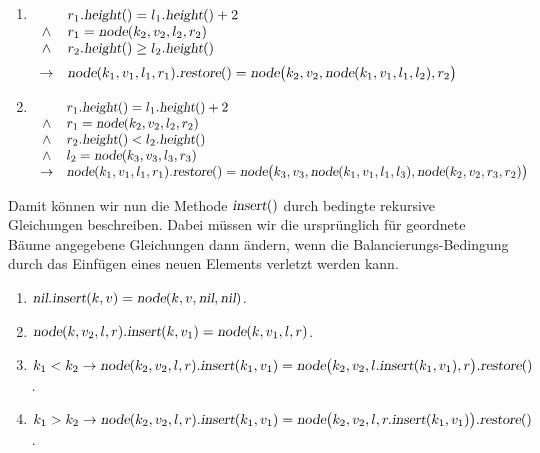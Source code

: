 \begin{enumerate}
      Es gibt noch zwei weitere F\"alle die auftreten, wenn der rechte Teilbaum um mehr als
      Eins gr\"o\3er ist als der linke Teilbaum.  Diese beiden F\"alle sind aber zu den beiden
      vorherigen F\"allen v\"ollig analog, so dass wir die Gleichungen hier ohne weitere
      Diskussion angeben.
\item $\begin{array}[t]{cl}
              & r_1.\textsl{height}() = l_1.\textsl{height}() + 2    \\ 
       \wedge & r_1 = \textsl{node}(k_2,v_2,l_2,r_2)               \\
       \wedge & r_2.\textsl{height}() \geq l_2.\textsl{height}()     \\[0.2cm]
       \rightarrow & \textsl{node}(k_1,v_1,l_1,r_1).\textsl{restore}() = 
                     \textsl{node}\bigl(k_2,v_2,\textsl{node}(k_1,v_1,l_1,l_2),r_2\bigr)
       \end{array}
      $
\item $\begin{array}[t]{cl}
               & r_1.\textsl{height}() = l_1.\textsl{height}() + 2    \\ 
        \wedge & r_1 = \textsl{node}(k_2,v_2,l_2,r_2)               \\
        \wedge & r_2.\textsl{height}() < l_2.\textsl{height}()     \\
        \wedge & l_2 = \textsl{node}(k_3,v_3,l_3,r_3)               \\
        \rightarrow & \textsl{node}(k_1,v_1,l_1,r_1).\textsl{restore}() = 
                      \textsl{node}\bigl(k_3,v_3,\textsl{node}(k_1,v_1,l_1,l_3),\textsl{node}(k_2,v_2,r_3,r_2) \bigr)
        \end{array}
       $

\end{enumerate}
Damit k\"onnen wir nun die Methode $\textsl{insert}()$ durch bedingte rekursive Gleichungen 
beschreiben.  Dabei m\"ussen wir die urspr\"unglich f\"ur geordnete B\"aume angegebene Gleichungen
dann \"andern, wenn die Balancierungs-Bedingung durch das Einf\"ugen eines neuen Elements
verletzt werden kann.
\begin{enumerate}
\item $\textsl{nil}\mathtt{.}\textsl{insert}(k,v) = \textsl{node}(k,v, \textsl{nil}, \textsl{nil})$.  
\item $\textsl{node}(k, v_2, l, r)\mathtt{.}\textsl{insert}(k,v_1) = \textsl{node}(k, v_1, l, r)$.
\item $k_1 < k_2 \rightarrow 
          \textsl{node}(k_2, v_2, l, r)\mathtt{.}\textsl{insert}(k_1, v_1) =
          \textsl{node}\bigl(k_2, v_2, l\mathtt{.}\textsl{insert}(k_1, v_1), r\bigr).\textsl{restore}()$.
\item $k_1 > k_2 \rightarrow 
         \textsl{node}(k_2, v_2, l, r)\mathtt{.}\textsl{insert}(k_1, v_1) = 
         \textsl{node}\bigl(k_2, v_2, l, r\mathtt{.}\textsl{insert}(k_1, v_1)\bigr).\textsl{restore}()$.
\end{enumerate}

